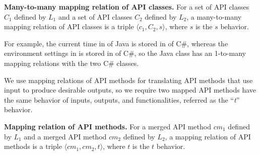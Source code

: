 \textbf{Many-to-many mapping relation of API classes.} For a set of API classes
$C_1$ defined by $L_1$ and a set of API classes $C_2$ defined by
$L_2$, a many-to-many mapping relation of API classes is a triple
$\langle c_1, C_2, s \rangle$, where $s$ is the $s$ behavior.

For example, the current time in  of Java
is stored in  of C\#, whereas the
environment settings in  is stored in
 of C\#, so the Java class has an
1-to-many mapping relations with the two C\# classes.

We use mapping relations of API methods for translating API methods
that use input to produce desirable outputs, so we require two
mapped API methods have the same behavior of inputs, outputs, and
functionalities, referred as the ``\emph{t}'' behavior.

\textbf{Mapping relation of API methods.} For a merged API method
$cm_1$ defined by $L_1$ and a merged API method $cm_2$ defined by
$L_2$, a mapping relation of API methods is a triple $\langle cm_1,
cm_2, t \rangle$, where $t$ is the $t$ behavior.
